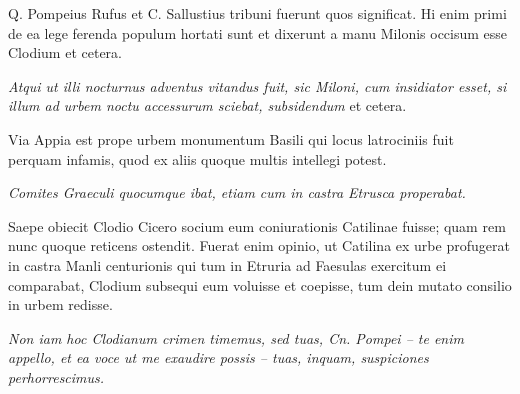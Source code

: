 Q. Pompeius Rufus et C. Sallustius tribuni fuerunt quos significat. Hi enim primi de ea lege ferenda populum hortati sunt et dixerunt a manu Milonis occisum esse Clodium et cetera.

\textit{Atqui ut illi nocturnus adventus vitandus fuit, sic Miloni, cum insidiator esset, si illum ad urbem noctu accessurum sciebat, subsidendum} et cetera.

Via Appia est prope urbem monumentum Basili qui locus latrociniis fuit perquam infamis, quod ex aliis quoque multis intellegi potest.

\textit{Comites Graeculi quocumque ibat, etiam cum in castra Etrusca properabat.}

Saepe obiecit Clodio Cicero socium eum coniurationis Catilinae fuisse; quam rem nunc quoque reticens ostendit. Fuerat enim opinio, ut Catilina ex urbe profugerat in castra Manli centurionis qui tum in Etruria ad Faesulas exercitum ei comparabat, Clodium subsequi eum voluisse et coepisse, tum dein mutato consilio in urbem redisse.

\textit{Non iam hoc Clodianum crimen timemus, sed tuas, Cn. Pompei – te enim appello, et ea voce ut me exaudire possis – tuas, inquam, suspiciones perhorrescimus.}

